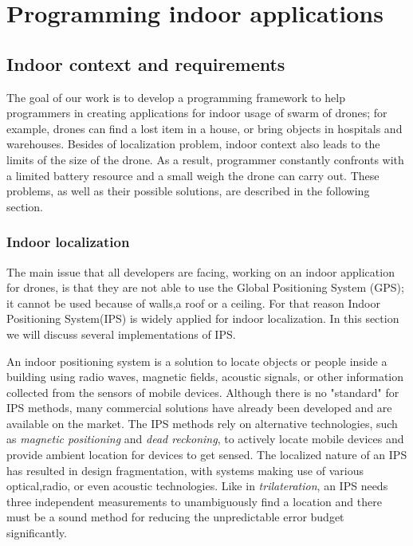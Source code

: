 \chapter{Programming indoor applications}
\label{cap3}



\section {Indoor context and requirements}

The goal of our work is to develop a programming framework to help programmers in creating applications for indoor usage of swarm of drones; for example, drones can find a lost item in a house, or bring objects in hospitals and warehouses.
Besides of localization problem, indoor context also leads to the limits of the size of the drone. As a result, programmer constantly confronts with a limited battery resource and a small weigh the drone can carry out. These problems, as well as their possible solutions, are described in the following section.

\subsection{Indoor localization}

The main issue that all developers are facing, working on an indoor application for drones, is that they are not able to use the Global Positioning System (GPS); it cannot be used because of walls,a roof or a ceiling. For that reason Indoor Positioning System(IPS) is widely applied for indoor localization. In this section we will discuss several implementations of IPS.  

An indoor positioning system is a solution to locate objects or people inside a building using radio waves, magnetic fields, acoustic signals, or other information collected from the sensors of mobile devices.
Although there is no "standard" for IPS methods, many commercial solutions have already been developed and are available on the market.
The IPS methods rely on alternative technologies, such as \textit{magnetic positioning} and \textit{dead reckoning}, to actively locate mobile devices and provide ambient location for devices to get sensed.
The localized nature of an IPS has resulted in design fragmentation, with systems making use of various optical,radio, or even acoustic technologies.
Like in \textit{trilateration}, an IPS needs three independent measurements to unambiguously find a location and there must be a sound method for reducing the unpredictable error budget significantly.

